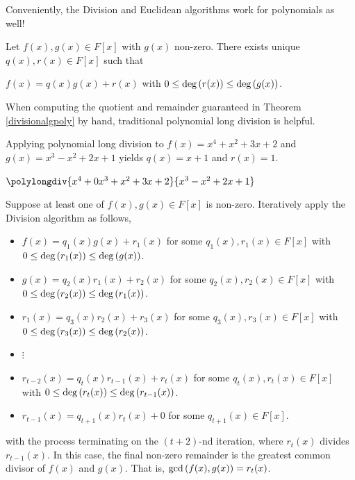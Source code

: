 \documentclass[11pt,fleqn,dvipsnames,usenames]{article}
\newcommand{\p}{\noindent}
\begin{document}
%
\p Conveniently, the Division and Euclidean algorithms work for polynomials as well!
%
\begin{theorem}\label{divisionalgpoly}
Let $f(x),g(x)\in F[x]$ with $g(x)$ non-zero.  There exists unique $q(x),r(x)\in F[x]$ such that
\begin{center}
$f(x) = q(x)g(x) + r(x)$ with $0\leq \text{deg}\left(r(x)\right) \leq \text{deg}\left(g(x)\right)$.
\end{center}
\end{theorem}
%
\begin{remark}
When computing the quotient and remainder guaranteed in Theorem \ref{divisionalgpoly} by hand, traditional polynomial long division is helpful.
\end{remark}
%
\begin{example} Applying polynomial long division to $f(x) = x^4 + x^2 + 3x + 2$ and $g(x) = x^3 - x^2 + 2x + 1$ yields $q(x) = x + 1$ and $r(x) = 1$.
\vsp

\begin{center}
$\polylongdiv{x^4 + 0x^3 + x^2 + 3x + 2}{x^3 - x^2 + 2x + 1}$
\end{center}
\end{example}
\vsp
%
\begin{theorem}\label{euclideanpoly}
Suppose at least one of $f(x),g(x)\in F[x]$ is non-zero.  Iteratively apply the Division algorithm as follows,
\begin{itemize}[\ ]
\item $f(x) = q_1(x)g(x) + r_1(x)$ for some $q_1(x),r_1(x)\in F[x]$ with $0\leq \text{deg}\left(r_{1}(x)\right)\leq \text{deg}\left(g(x)\right)$.
\item $g(x) = q_2(x)r_{1}(x) + r_2(x)$ for some $q_2(x),r_2(x)\in F[x]$ with $0\leq \text{deg}\left(r_{2}(x)\right)\leq \text{deg}\left(r_{1}(x)\right)$.
\item $r_{1}(x) = q_3(x)r_{2}(x) + r_3(x)$ for some $q_3(x),r_3(x)\in F[x]$ with $0\leq \text{deg}\left(r_{3}(x)\right)\leq \text{deg}\left(r_{2}(x)\right)$.
\item {}$\vdots$
\item $r_{t-2}(x) = q_{t}(x)r_{t-1}(x) + r_{t}(x)$ for some $q_{t}(x),r_{t}(x)\in F[x]$ with $0\leq \text{deg}\left(r_{t}(x)\right)\leq \text{deg}\left(r_{t-1}(x)\right)$.
\item $r_{t-1}(x) = q_{t+1}(x)r_{t}(x) + 0$ for some $q_{t+1}(x)\in F[x]$.
\end{itemize}
with the process terminating on the $(t+2)$-nd iteration, where $r_{t}(x)$ divides $r_{t-1}(x)$.  In this case, the final non-zero remainder is the greatest common divisor of $f(x)$ and $g(x)$.  That is, $\text{gcd}\left(f(x),g(x)\right) = r_{t}(x)$.
\end{theorem}
\end{document}
